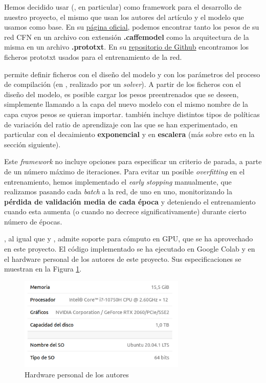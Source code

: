 \documentclass[10pt,a4paper]{article}
\begin{document}
Hemos decidido usar  (, en particular) como framework para el desarrollo de nuestro proyecto, el mismo que usan los autores del artículo y el modelo que usamos como base. En su \href{https://www.cvg.unibe.ch/media/project/noroozi/JigsawPuzzleSolver.html}{página oficial}, podemos encontrar tanto los pesos de su red CFN en un archivo con extensión \textbf{.caffemodel} como la arquitectura de la misma en un archivo \textbf{.prototxt}. En su \href{https://github.com/MehdiNoroozi/JigsawPuzzleSolver}{repositorio de Github} encontramos los ficheros prototxt usados para el entrenamiento de la red.

 permite definir ficheros con el diseño del modelo y con los parámetros del proceso de compilación (en , realizado por un \textit{solver}). A partir de los ficheros con el diseño del modelo, es posible cargar los pesos preentrenados que se deseen, simplemente llamando a la capa del nuevo modelo con el mismo nombre de la capa cuyos pesos se quieran importar.  también incluye distintos tipos de políticas de variación del ratio de aprendizaje con las que se han experimentado, en particular con el decaimiento \textbf{exponencial} y en \textbf{escalera} (más sobre esto en la sección siguiente). 

Este \textit{framework} no incluye opciones para especificar un criterio de parada, a parte de un número máximo de iteraciones. Para evitar un posible \textit{overfitting} en el entrenamiento, hemos implementado el \textit{early stopping} manualmente, que realizamos pasando cada \textit{batch} a la red, de uno en uno, monitorizando la \textbf{pérdida de validación media de cada época} y deteniendo el entrenamiento cuando esta aumenta (o cuando no decrece significativamente) durante cierto número de épocas.

, al igual que  y , admite soporte para cómputo en GPU, que se ha aprovechado en este proyecto. El código implementado se ha ejecutado en Google Colab y en el hardware personal de los autores de este proyecto. Sus especificaciones se muestran en la Figura \ref{fig:hardware_pc}.

\hfill \break


\begin{figure}[h]
	\centering
	\includegraphics[width=300px]{hardware_pc}
	\caption{Hardware personal de los autores}
	\label{fig:hardware_pc}
\end{figure}
\end{document}
